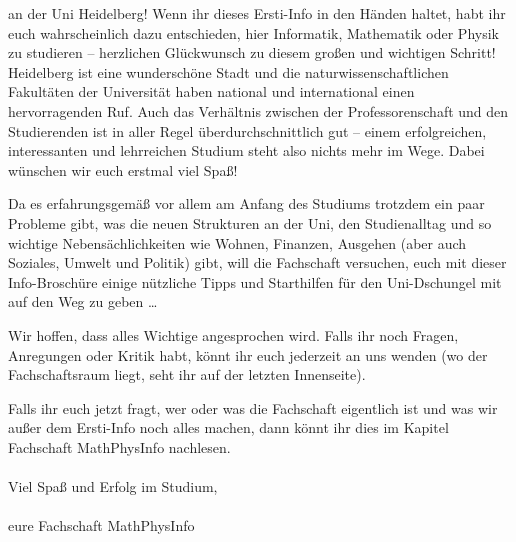 an der Uni Heidelberg! Wenn ihr dieses Ersti-Info in den Händen haltet, habt ihr euch wahrscheinlich dazu entschieden, hier Informatik, Mathematik oder Physik zu studieren -- herzlichen Glückwunsch zu diesem großen und wichtigen Schritt! Heidelberg ist eine wunderschöne Stadt und die naturwissenschaftlichen Fakultäten der Universität haben national und international einen hervorragenden Ruf. Auch das Verhältnis zwischen der Professorenschaft und den Studierenden ist in aller Regel überdurchschnittlich gut -- einem erfolgreichen, interessanten und lehrreichen Studium steht also nichts mehr im Wege. Dabei wünschen wir euch erstmal viel Spaß! \smiley

Da es erfahrungsgemäß vor allem am Anfang des Studiums trotzdem ein paar Probleme gibt, was die neuen Strukturen an der Uni, den Studienalltag und so wichtige Nebensächlichkeiten wie Wohnen, Finanzen, Ausgehen (aber auch Soziales, Umwelt und Politik) gibt, will die Fachschaft versuchen, euch mit dieser Info-Broschüre einige nützliche Tipps und Starthilfen für den Uni-Dschungel mit auf den Weg zu geben \dots


Wir hoffen, dass alles Wichtige angesprochen wird. Falls ihr noch Fragen, Anregungen oder Kritik habt, könnt ihr euch jederzeit an uns wenden (wo der Fachschaftsraum liegt, seht ihr auf der letzten Innenseite).

Falls ihr euch jetzt fragt, wer oder was die Fachschaft eigentlich ist und was wir außer dem Ersti-Info noch alles machen, dann könnt ihr dies im Kapitel Fachschaft MathPhysInfo nachlesen. \\\\
\noindent Viel Spaß und Erfolg im Studium,\\\\

eure Fachschaft MathPhysInfo
